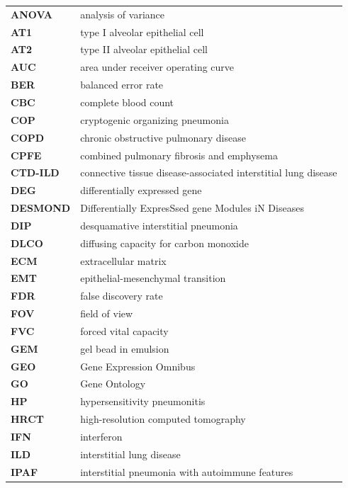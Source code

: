 \documentclass[
]{article}
\begin{document}
\begin{singlespace}


\begin{longtable}{>{}ll}

\textbf{ANOVA} & analysis of variance\\
\textbf{AT1} & type I alveolar epithelial cell\\
\textbf{AT2} & type II alveolar epithelial cell\\
\textbf{AUC} & area under receiver operating curve\\
\textbf{BER} & balanced error rate\\
\addlinespace
\textbf{CBC} & complete blood count\\
\textbf{COP} & cryptogenic organizing pneumonia\\
\textbf{COPD} & chronic obstructive pulmonary disease\\
\textbf{CPFE} & combined pulmonary fibrosis and emphysema\\
\textbf{CTD-ILD} & connective tissue disease-associated interstitial lung disease\\
\addlinespace
\textbf{DEG} & differentially expressed gene\\
\textbf{DESMOND} & Differentially ExpresSsed gene Modules iN Diseases\\
\textbf{DIP} & desquamative interstitial pneumonia\\
\textbf{DLCO} & diffusing capacity for carbon monoxide\\
\textbf{ECM} & extracellular matrix\\
\addlinespace
\textbf{EMT} & epithelial-mesenchymal transition\\
\textbf{FDR} & false discovery rate\\
\textbf{FOV} & field of view\\
\textbf{FVC} & forced vital capacity\\
\textbf{GEM} & gel bead in emulsion\\
\addlinespace
\textbf{GEO} & Gene Expression Omnibus\\
\textbf{GO} & Gene Ontology\\
\textbf{HP} & hypersensitivity pneumonitis\\
\textbf{HRCT} & high-resolution computed tomography\\
\textbf{IFN} & interferon\\
\addlinespace
\textbf{ILD} & interstitial lung disease\\
\textbf{IPAF} & interstitial pneumonia with autoimmune features\\

\end{longtable}
\end{singlespace}
\end{document}
